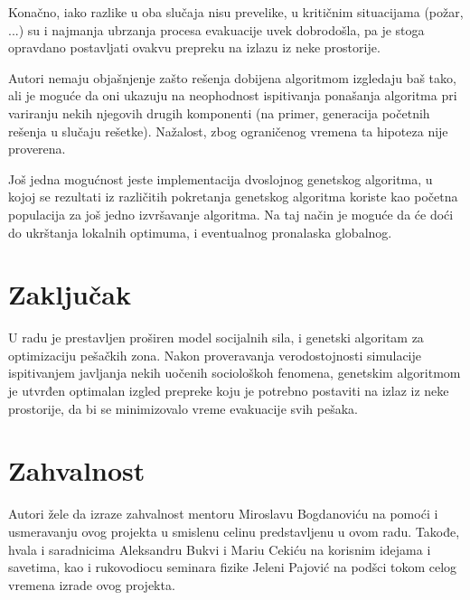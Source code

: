 \documentclass[12pt]{article}
\begin{document}
Konačno, iako razlike u oba slučaja nisu prevelike, u kritičnim situacijama (požar, ...) su i najmanja ubrzanja procesa evakuacije uvek dobrodošla, pa je stoga opravdano postavljati ovakvu prepreku na izlazu iz neke prostorije.

Autori nemaju objašnjenje zašto rešenja dobijena algoritmom izgledaju baš tako, ali je moguće da oni ukazuju na neophodnost ispitivanja ponašanja algoritma pri variranju nekih njegovih drugih komponenti (na primer, generacija početnih rešenja u slučaju rešetke). Nažalost, zbog ograničenog vremena ta hipoteza nije proverena.

Još jedna mogućnost jeste implementacija dvoslojnog genetskog algoritma, u kojoj se rezultati iz različitih pokretanja genetskog algoritma koriste kao početna populacija za još jedno izvršavanje algoritma. Na taj način je moguće da će doći do ukrštanja lokalnih optimuma, i eventualnog pronalaska globalnog.

\section{Zaključak}

U radu je prestavljen proširen model socijalnih sila, i genetski algoritam za optimizaciju pešačkih zona. Nakon proveravanja verodostojnosti simulacije ispitivanjem javljanja nekih uočenih sociološkoh fenomena, genetskim algoritmom je utvrđen optimalan izgled prepreke koju je potrebno postaviti na izlaz iz neke prostorije, da bi se minimizovalo vreme evakuacije svih pešaka.

\section*{Zahvalnost}
Autori žele da izraze zahvalnost mentoru Miroslavu Bogdanoviću na pomoći i usmeravanju ovog projekta u smislenu celinu predstavljenu u ovom radu. Takođe, hvala i saradnicima Aleksandru Bukvi i Mariu Cekiću na korisnim idejama i savetima, kao i rukovodiocu seminara fizike Jeleni Pajović na podšci tokom celog vremena izrade ovog projekta. 


  
\begin{scriptsize}

\end{scriptsize}
\end{document}
